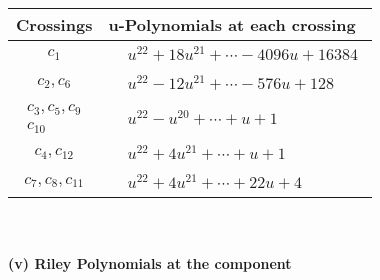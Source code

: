 \documentclass[1p]{elsarticle_modified}
\theoremstyle{definition}
\begin{document}
\begin{tabular}{m{50pt}|m{274pt}}
Crossings & \hspace{64pt}u-Polynomials at each crossing \\
\hline $$\begin{aligned}c_{1}\end{aligned}$$&$\begin{aligned}
&u^{22}+18 u^{21}+\cdots-4096 u+16384
\end{aligned}$\\
\hline $$\begin{aligned}c_{2},c_{6}\end{aligned}$$&$\begin{aligned}
&u^{22}-12 u^{21}+\cdots-576 u+128
\end{aligned}$\\
\hline $$\begin{aligned}c_{3},c_{5},c_{9}\\c_{10}\end{aligned}$$&$\begin{aligned}
&u^{22}- u^{20}+\cdots+u+1
\end{aligned}$\\
\hline $$\begin{aligned}c_{4},c_{12}\end{aligned}$$&$\begin{aligned}
&u^{22}+4 u^{21}+\cdots+u+1
\end{aligned}$\\
\hline $$\begin{aligned}c_{7},c_{8},c_{11}\end{aligned}$$&$\begin{aligned}
&u^{22}+4 u^{21}+\cdots+22 u+4
\end{aligned}$\\
\hline
\end{tabular}\\~\\
\newpage\renewcommand{\arraystretch}{1}
\flushleft \textbf{(v) Riley Polynomials at the component}\newline \\
\end{document}
